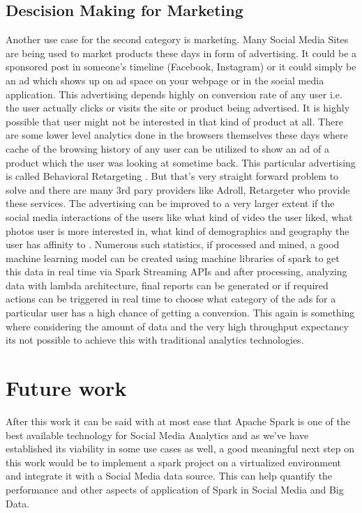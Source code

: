 \documentclass[sigconf]{acmart}
\begin{document}
\subsection{Descision Making for Marketing}
Another use case for the second category is marketing. Many Social Media Sites are being used to market products these days in form of advertising. It could be a sponsored post in someone's timeline (Facebook, Instagram) or it could simply be an ad which shows up on ad space on your webpage or in the social media application. This advertising depends highly on conversion rate of any user i.e. the user actually clicks or visits the site or product being advertised. It is highly possible that user might not be interested in that kind of product at all. There are some lower level analytics done in the browsers themselves these days where cache of the browsing history of any user can be utilized to show an ad of a product which the user was looking at sometime back. This particular advertising is called Behavioral Retargeting \cite{bretargeting}. But that's very straight forward problem to solve and there are many 3rd pary providers like Adroll, Retargeter who provide these services. The advertising can be improved to a very larger extent if the social media interactions of the users like what kind of video the user liked, what photos user is more interested in, what kind of demographics and geography the user has affinity to \cite{likematters}. Numerous such statistics, if processed and mined, a good machine learning model can be created using machine libraries of spark to get this data in real time via Spark Streaming APIs and after processing, analyzing data with lambda architecture, final reports can be generated or if required actions can be triggered in real time to choose what category of the ads for a particular user has a high chance of getting a conversion. This again is something where considering the amount of data and the very high throughput expectancy its not possible to achieve this with traditional analytics technologies\cite{krishnan}.
\section{Future work}
After this work it can be said with at most ease that Apache Spark is one of the best available technology for Social Media Analytics and as we've have established its viability in some use cases as well, a good meaningful next step on this work would be to implement a spark project on a virtualized environment and integrate it with a Social Media data source. This can help quantify the performance and other aspects of application of Spark in Social Media and Big Data.
\end{document}
